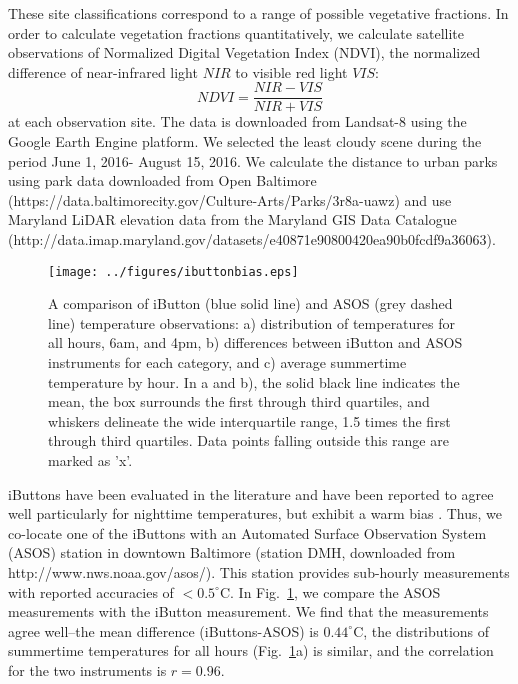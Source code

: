 \documentclass[draft,linenumbers]{agujournal}
\begin{document}
These site classifications correspond to a range of possible vegetative fractions. In order to calculate vegetation fractions quantitatively, we calculate satellite observations of Normalized Digital Vegetation Index (NDVI), the normalized difference of near-infrared light $NIR$ to visible red light $VIS$: 
\[NDVI = \frac{NIR-VIS}{NIR+VIS}\]
at each observation site. The data is downloaded from Landsat-8 using the Google Earth Engine platform. We selected the least cloudy scene during the period June 1, 2016- August 15, 2016.  
We calculate the distance to urban parks using park data downloaded from Open Baltimore (https://data.baltimorecity.gov/Culture-Arts/Parks/3r8a-uawz) and use Maryland LiDAR elevation data from the Maryland GIS Data Catalogue (http://data.imap.maryland.gov/datasets/e40871e90800420ea90b0fcdf9a36063). 

\begin{figure}
\centering
\texttt{[image: ../figures/ibuttonbias.eps]}
\caption{A comparison of iButton (blue solid line) and ASOS (grey dashed line) temperature observations: a) distribution of temperatures for all hours,  6am, and 4pm, b) differences between iButton and ASOS instruments for each category, and c) average summertime temperature by hour. In a and b), the solid black line indicates the mean, the box surrounds the first through third quartiles, and whiskers delineate the wide interquartile range, 1.5 times the first through third quartiles. Data points falling outside this range are marked as 'x'. }
\label{fig:bias}
\end{figure}

iButtons have been evaluated in the literature and have been reported to agree well particularly for nighttime temperatures, but exhibit a warm bias \citep{scott2017temperature,terando2017ad}. Thus, we co-locate one of the iButtons with an Automated Surface Observation System (ASOS) station in downtown Baltimore (station DMH, downloaded from http://www.nws.noaa.gov/asos/). This station provides sub-hourly measurements with reported accuracies of $< 0.5^\circ $C. In Fig.~\ref{fig:bias}, we compare the ASOS measurements with the iButton measurement. We find that the measurements agree well--the mean difference (iButtons-ASOS) is $0.44^\circ$C, the distributions of summertime temperatures for all hours (Fig.~\ref{fig:bias}a) is similar, and the correlation for the two instruments is $r = 0.96$. 
\end{document}
